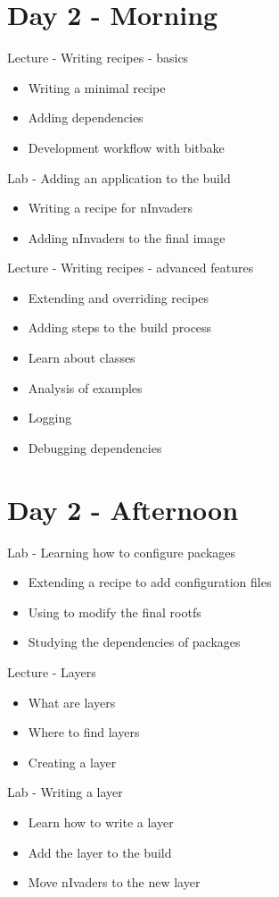 \documentclass[a4paper,12pt,obeyspaces,spaces,hyphens]{article}
\begin{document}
\section{Day 2 - Morning}

\feagendatwocolumn
{Lecture - Writing recipes - basics}
{
  \begin{itemize}
  \item Writing a minimal recipe
  \item Adding dependencies
  \item Development workflow with bitbake
  \end{itemize}
}
{Lab - Adding an application to the build}
{
  \begin{itemize}
  \item Writing a recipe for nInvaders
  \item Adding nInvaders to the final image
  \end{itemize}
}

\feagendaonecolumn
{Lecture - Writing recipes - advanced features}
{
  \begin{itemize}
  \item Extending and overriding recipes
  \item Adding steps to the build process
  \item Learn about classes
  \item Analysis of examples
  \item Logging
  \item Debugging dependencies
  \end{itemize}
}

\section{Day 2 - Afternoon}

\feagendaonecolumn
{Lab - Learning how to configure packages}
{
  \begin{itemize}
  \item Extending a recipe to add configuration files
  \item Using  to modify the final rootfs
  \item Studying the dependencies of packages
  \end{itemize}
}
\feagendatwocolumn
{Lecture - Layers}
{
  \begin{itemize}
  \item What are layers
  \item Where to find layers
  \item Creating a layer
  \end{itemize}
}
{Lab - Writing a layer}
{
  \begin{itemize}
  \item Learn how to write a layer
  \item Add the layer to the build
  \item Move nIvaders to the new layer
  \end{itemize}
}
\end{document}
